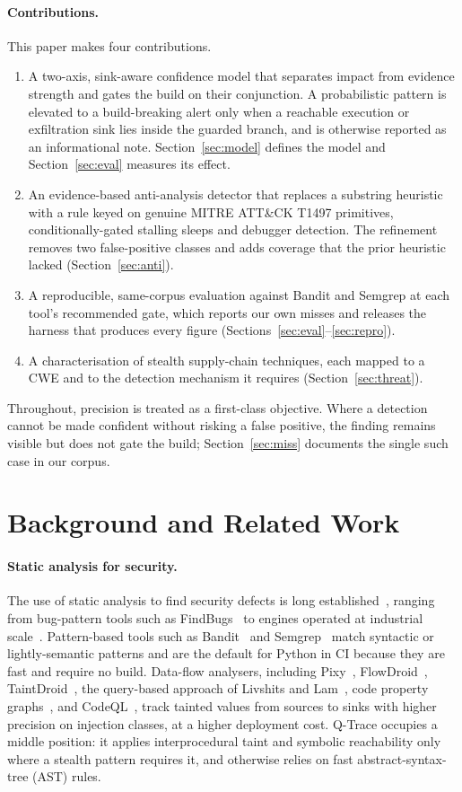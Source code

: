 \documentclass[runningheads]{llncs}
\begin{document}
\paragraph{Contributions.} This paper makes four contributions.
\begin{enumerate}
\item A two-axis, sink-aware confidence model that separates impact from
evidence strength and gates the build on their conjunction. A probabilistic
pattern is elevated to a build-breaking alert only when a reachable
execution or exfiltration sink lies inside the guarded branch, and is otherwise
reported as an informational note. Section~\ref{sec:model} defines the model and
Section~\ref{sec:eval} measures its effect.
\item An evidence-based anti-analysis detector that replaces a substring
heuristic with a rule keyed on genuine MITRE ATT\&CK T1497 primitives,
conditionally-gated stalling sleeps and debugger detection. The refinement
removes two false-positive classes and adds coverage that the prior heuristic
lacked (Section~\ref{sec:anti}).
\item A reproducible, same-corpus evaluation against Bandit and Semgrep at each
tool's recommended gate, which reports our own misses and releases the harness
that produces every figure (Sections~\ref{sec:eval}--\ref{sec:repro}).
\item A characterisation of stealth supply-chain techniques, each mapped to a CWE
and to the detection mechanism it requires (Section~\ref{sec:threat}).
\end{enumerate}
Throughout, precision is treated as a first-class objective. Where a detection
cannot be made confident without risking a false positive, the finding remains
visible but does not gate the build; Section~\ref{sec:miss} documents the single
such case in our corpus.

\section{Background and Related Work}\label{sec:related}
\paragraph{Static analysis for security.}
The use of static analysis to find security defects is long
established~\cite{chessmcgraw}, ranging from bug-pattern tools such as
FindBugs~\cite{findbugs} to engines operated at industrial
scale~\cite{infer}. Pattern-based tools such as Bandit~\cite{bandit} and
Semgrep~\cite{semgrep} match syntactic or lightly-semantic patterns and are the
default for Python in CI because they are fast and require no build. Data-flow
analysers, including Pixy~\cite{pixy}, FlowDroid~\cite{flowdroid},
TaintDroid~\cite{taintdroid}, the query-based approach of Livshits and
Lam~\cite{livshits}, code property graphs~\cite{cpg}, and CodeQL~\cite{codeql},
track tainted values from sources to sinks with higher precision on injection
classes, at a higher deployment cost. Q-Trace occupies a middle position: it
applies interprocedural taint and symbolic reachability only where a stealth
pattern requires it, and otherwise relies on fast abstract-syntax-tree (AST)
rules.
\end{document}
